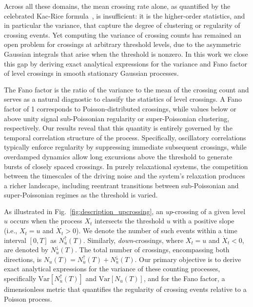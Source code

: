 \documentclass[journal]{IEEEtran}
\theoremstyle{plain}
\theoremstyle{definition}
\theoremstyle{remark}
\newcommand{\Nu}{N_u(T)}
\newcommand{\Nup}{N_u^{\uparrow}(T)}
\newcommand{\Ndown}{N_u^{\downarrow}(T)}
\newcommand{\Var}{\text{Var}}
\begin{document}
Across all these domains, the mean crossing 
rate alone, as quantified by the celebrated 
Kac-Rice formula~\cite{kac1943, rice1944mathematical}, 
is insufficient: it is the higher-order statistics, 
and in particular the variance, that capture 
the degree of clustering or regularity of 
crossing events. 
Yet computing the variance of crossing counts 
has remained an open problem for crossings 
at arbitrary threshold levels, due to the 
asymmetric Gaussian integrals that arise when 
the threshold is nonzero. 
In this work we close this gap by deriving exact 
analytical expressions for the variance and Fano 
factor of level crossings in smooth stationary 
Gaussian processes. 

The Fano factor is the ratio of the variance 
to the mean of the crossing count and serves 
as a natural diagnostic to classify the 
statistics of level crossings. A Fano factor 
of 1 corresponds to Poisson-distributed crossings, 
while values below or above unity signal sub-Poissonian regularity or super-Poissonian clustering, respectively. 
Our results reveal that this quantity is entirely 
governed by the temporal correlation structure of 
the process. Specifically, oscillatory correlations 
typically enforce regularity by suppressing immediate 
subsequent crossings, while overdamped dynamics allow 
long excursions above the threshold to generate bursts 
of closely spaced crossings. In purely relaxational 
systems, the competition between the timescales of 
the driving noise and the system's relaxation produces 
a richer landscape, including reentrant transitions 
between sub-Poissonian and super-Poissonian regimes as the 
threshold is varied. 


As illustrated in Fig.~\ref{fig:description_upcrossing}, an \textit{up}-crossing of a given level $u$ occurs when the process $X_t$ intersects the threshold $u$ with a positive slope (i.e., $X_t = u$ and $\dot{X}_t > 0$). We denote the number of such events within a time interval $[0, T]$ as $\Nup$. Similarly, \textit{down}-crossings, where $X_t=u$ and $\dot{X}_t < 0$, are denoted by $\Ndown$. The total number of crossings, encompassing both directions, is $\Nu = \Nup + \Ndown$. Our primary objective is to derive exact analytical expressions for the variance of these counting processes, specifically $\Var[\Nup]$ and $\Var[\Nu]$, and for the Fano factor, a dimensionless metric that quantifies the regularity of crossing events relative to a Poisson process.
\end{document}
